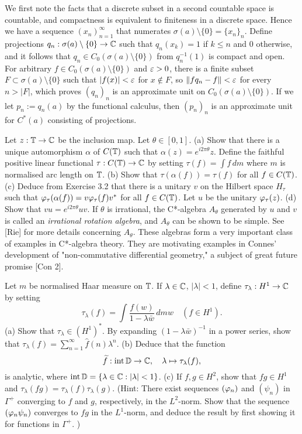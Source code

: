 \documentclass{article}
\begin{document}
\begin{sol}
We first note the facts that a discrete subset in a second countable space is countable, and compactness is equivalent to finiteness in a discrete space.
Hence we have a sequence $(x_n)_{n=1}^\infty$ that numerates $\sigma(a)\setminus\{0\}=\{x_n\}_n$.
Define projections $q_n:\sigma(a)\setminus\{0\}\to\mathbb{C}$ such that $q_n(x_k)=1$ if $k\le n$ and 0 otherwise, and it follows that $q_n\in C_0(\sigma(a)\setminus\{0\})$ from $q_n^{-1}(1)$ is compact and open.
For arbitrary $f\in C_0(\sigma(a)\setminus\{0\})$ and $\varepsilon>0$, there is a finite subset $F\subset\sigma(a)\setminus\{0\}$ such that $|f(x)|<\varepsilon$ for $x\notin F$, so $\|fq_n-f\|<\varepsilon$ for every $n>|F|$, which proves $(q_n)_n$ is an approximate unit on $C_0(\sigma(a)\setminus\{0\})$.
If we let $p_n:=q_n(a)$ by the functional calculus, then $(p_n)_n$ is an approximate unit for $C^*(a)$ consisting of projections.
\end{sol}


\begin{prb}
Let $z:\mathbb{T}\to\mathbb{C}$ be the inclusion map.
Let $\theta\in[0,1]$.
(a) Show that there is a unique automorphism $\alpha$ of $C(\mathbb{T})$ such that $\alpha(z)=e^{i2\pi\theta}z$.
Define the faithful positive linear functional $\tau:C(\mathbb{T})\to\mathbb{C}$ by setting $\tau(f)=\int f\,dm$ where $m$ is normalised arc length on $\mathbb{T}$.
(b) Show that $\tau(\alpha(f))=\tau(f)$ for all $f\in C(\mathbb{T})$.
(c) Deduce from Exercise 3.2 that there is a unitary $v$ on the Hilbert space $H_\tau$ such that $\varphi_\tau(\alpha(f))=v\varphi_\tau(f)v^*$ for all $f\in C(\mathbb{T})$.
Let $u$ be the unitary $\varphi_\tau(z)$.
(d) Show that $vu=e^{i2\pi\theta}uv$.
If $\theta$ is irrational, the C*-algebra $A_\theta$ generated by $u$ and $v$ is called an \emph{irrational rotation algebra}, and $A_\theta$ can be shown to be simple.
See [Rie] for more details concerning $A_\theta$.
These algebras form a very important class of examples in C*-algebra theory.
They are motivating examples in Connes' development of "non-commutative differential geometry," a subject of great future promise [Con 2].
\end{prb}
\begin{sol}
\end{sol}


\begin{prb}
Let $m$ be normalised Haar measure on $\mathbb{T}$.
If $\lambda\in\mathbb{C}$, $|\lambda|<1$, define $\tau_\lambda:H^1\to\mathbb{C}$ by setting
\[\tau_\lambda(f)=\int\frac{f(w)}{1-\lambda\bar w}\,dmw\quad(f\in H^1).\]
(a) Show that $\tau_\lambda\in(H^1)^*$.
By expanding $(1-\lambda\bar w)^{-1}$ in a power series, show that $\tau_\lambda(f)=\sum_{n=1}^\infty\hat f(n)\lambda^n$.
(b) Deduce that the function
\[\widetilde f:\operatorname{int}\mathbb{D}\to\mathbb{C},\quad\lambda\mapsto\tau_\lambda(f),\]
is analytic, where $\operatorname{int}\mathbb{D}=\{\lambda\in\mathbb{C}:|\lambda|<1\}$.
(c) If $f,g\in H^2$, show that $fg\in H^1$ and $\tau_\lambda(fg)=\tau_\lambda(f)\tau_\lambda(g)$.
(Hint: There exist sequences $(\varphi_n)$ and $(\psi_n)$ in $\Gamma^+$ converging to $f$ and $g$, respectively, in the $L^2$-norm.
Show that the sequence $(\varphi_n\psi_n)$ converges to $fg$ in the $L^1$-norm, and deduce the result by first showing it for functions in $\Gamma^+$. )
\end{prb}
\begin{sol}
\end{sol}
\end{document}
